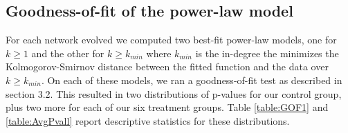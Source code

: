 \documentclass{nws}
\begin{document}
\subsection{Goodness-of-fit of the power-law model} \label{ssec:GOF of power law}

For each network evolved we computed two best-fit power-law models, one for $k \geq 1$ and the other for $k\geq k_{min}$ where $k_{min}$ is the in-degree the minimizes the Kolmogorov-Smirnov distance between the fitted function and the data over $k \geq k_{min}$. On each of these models, we ran a goodness-of-fit test as described in section 3.2. This resulted in two distributions of p-values for our control group, plus two more for each of our six treatment groups. Table \ref{table:GOF1}
 and \ref{table:AvgPvall} report descriptive statistics for these distributions.
\end{document}
